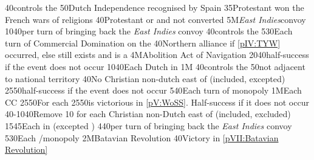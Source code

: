 %
 
%
%
{}{40}{\paysmajeurHollande controls the }%
%
%
{}{50}{Dutch Independence recognised by Spain}%
%
%
{}{35}{Protestant won the French wars of religions}%
%
%
{}{40}{\paysmajeurAngleterre Protestant or \PROTANG and not converted}%
%
\EUobjective5M{\emph{East Indies}}{convoy}%
{10}{40}{per turn of bringing back the \emph{East Indies} convoy}%
%
%
%
{}{40}{\paysmajeurHollande controls the }%
%
%
{5}{30}{Each turn of Commercial Domination on the }%
%
%
{}{40}{Northern \HRE alliance if \ref{pIV:TYW} occurred, else \payshanse still
  exists and is a \VASSAL}%
%
\EUobjective4M{Abolition Act of Navigation}{}%
{20}{40}{half-success if the event does not occur}%
%
%
{10}{40}{Each Dutch \COL in \continentBrazil}%
%
%
\EUobjective1M{}{}%
{}{40}{\paysmajeurHollande controls the }%
%
%
{}{50}{\paysmajeurFrance not adjacent to \paysmajeurHollande national
  territory}%
%
%
{}{40}{No Christian non-dutch \TP east of \granderegionMalacca (included,
  \continentSiberia excepted)}%
%
%
{25}{50}{half-success if the event does not occur}%
%
%
{5}{40}{Each turn of  monopoly}%
%
%
\EUobjective1M{Each \CC}{CC}%
{25}{50}{For each }%
%
%
{25}{50}{\HOL is victorious in \ref{pV:WoSS}. Half-success if it does not
  occur}%
%
%
{40-10}{40}{Remove 10 \VPs for each Christian non-Dutch \TP east of
   (included, \continentSiberia excluded)}%
%
%
{15}{45}{Each \COL in  (excepted )}%
%
%
{4}{40}{per turn of bringing back the \emph{East Indies} convoy}%
%
%
%
{5}{30}{Each \CTZ/\STZ monopoly}%
%
\EUobjective2M{Batavian Revolution}{}%
{}{40}{Victory in \ref{pVII:Batavian Revolution}}%
%
%
